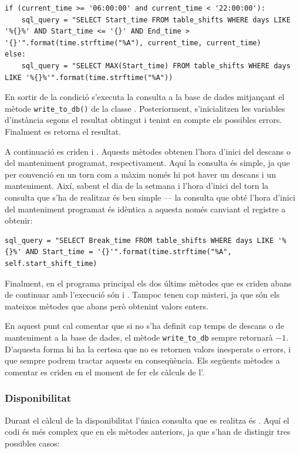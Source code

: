 \documentclass{tfgitic}[2022/06/30]
\begin{document}
\begin{lstlisting}[style=Python]
if (current_time >= '06:00:00' and current_time < '22:00:00'):
    sql_query = "SELECT Start_time FROM table_shifts WHERE days LIKE '%{}%' AND Start_time <= '{}' AND End_time > '{}'".format(time.strftime("%A"), current_time, current_time)
else:
    sql_query = "SELECT MAX(Start_time) FROM table_shifts WHERE days LIKE '%{}%'".format(time.strftime("%A"))
\end{lstlisting}

En sortir de la condició s'executa la consulta a la base de dades mitjançant el mètode \texttt{write\_to\_db()} de la classe . Posteriorment, s'inicialitzen les variables d'instància segons el resultat obtingut i tenint en compte els possibles errors. Finalment es retorna el resultat.

A continuació es criden  i . Aquests mètodes obtenen l'hora d'inici del descans o del manteniment programat, respectivament. Aquí la consulta és simple, ja que per convenció en un torn com a màxim només hi pot haver un descans i un manteniment. Així, sabent el dia de la setmana i l'hora d'inici del torn la consulta que s'ha de realitzar és ben simple --- la consulta que obté l'hora d'inici del manteniment programat és idèntica a aquesta només canviant el registre a obtenir: 

\begin{lstlisting}[style=sql]
sql_query = "SELECT Break_time FROM table_shifts WHERE days LIKE '%{}%' AND Start_time = '{}'".format(time.strftime("%A", self.start_shift_time)
\end{lstlisting}

Finalment, en el programa principal els dos últims mètodes que es criden abans de continuar amb l'execució són   i . Tampoc tenen cap misteri, ja que són els mateixos mètodes que abans però obtenint valors enters.

En aquest punt cal comentar que si no s'ha definit cap temps de descans o de manteniment a la base de dades, el mètode \texttt{write\_to\_db} sempre retornarà $-1$. D'aquesta forma hi ha la certesa que no es retornen valors inesperats o errors, i que sempre podrem tractar aquests en conseqüència. Els següents mètodes a comentar es criden en el moment de fer els càlculs de l'.

\subsubsection{Disponibilitat}
\label{subsection:oeeDis}
Durant el càlcul de la disponibilitat l'única consulta que es realitza és . Aquí el codi és més complex que en els mètodes anteriors, ja que s'han de distingir tres possibles casos:
\end{document}
